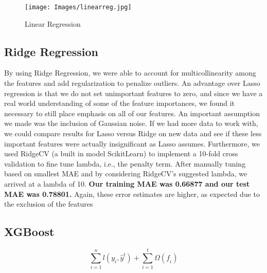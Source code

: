 \documentclass[twocolumn]{article}
\begin{document}
\begin{figure}[h!]
\centering
\texttt{[image: Images/linearreg.jpg]}
\caption{Linear Regression}
\end{figure}

\subsection{Ridge Regression}
\par{By using Ridge Regression, we were able to account for multicollinearity among the features and add regularization to penalize outliers. An advantage over Lasso regression is that we do not set unimportant features to zero, and since we have a real world understanding of some of the feature importances, we found it necessary to still place emphasis on all of our features. An important assumption we made was the inclusion of Gaussian noise. If we had more data to work with, we could compare results for Lasso versus Ridge on new data and see if these less important features were actually insignificant as Lasso assumes. Furthermore, we used RidgeCV (a built in model ScikitLearn) to implement a 10-fold cross validation to fine tune lambda, i.e., the penalty term. After manually tuning based on smallest MAE and by considering RidgeCV’s suggested lambda, we arrived at a lambda of 10. \textbf{Our training MAE was 0.66877 and our test MAE was 0.78801.} Again, these error estimates are higher, as expected due to the exclusion of the features  }

\subsection{XGBoost}

\begin{equation}
\sum_{i=1}^{n} \textit{l}(y_i,\hat{y}^t) + \sum_{i=1}^{t}\Omega(\textit{f}_i)
\end{equation}
\end{document}
